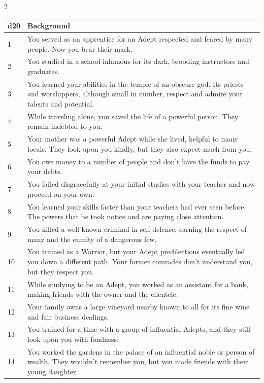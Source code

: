 \begin{multicols}{2}
\begin{table}
\begin{tabularx}{\textwidth}{| p{} | p{} |}
\hline
\textbf{d20} & \textbf{Background} \\
\hline
1 & You served as an apprentice for an Adept respected and feared by many people. Now you bear their mark. \\ \hline
2 & You studied in a school infamous for its dark, brooding instructors and graduates. \\ \hline
3 & You learned your abilities in the temple of an obscure god. Its priests and worshippers, although small in number, respect and admire your talents and potential.  \\ \hline
4 & While traveling alone, you saved the life of a powerful person. They remain indebted to you.  \\ \hline
5 & Your mother was a powerful Adept while she lived, helpful to many locals. They look upon you kindly, but they also expect much from you.  \\ \hline
6 & You owe money to a number of people and don’t have the funds to pay your debts. \\ \hline
7 & You failed disgracefully at your initial studies with your teacher and now proceed on your own. \\ \hline
8 & You learned your skills faster than your teachers had ever seen before. The powers that be took notice and are paying close attention.  \\ \hline
9 & You killed a well-known criminal in self-defense, earning the respect of many and the enmity of a dangerous few.  \\ \hline
10 & You trained as a Warrior, but your Adept predilections eventually led you down a different path. Your former comrades don’t understand you, but they respect you.  \\ \hline
11 & While studying to be an Adept, you worked as an assistant for a bank, making friends with the owner and the clientele. \\ \hline
12 & Your family owns a large vineyard nearby known to all for its fine wine and fair business dealings. \\ \hline
13 & You trained for a time with a group of influential Adepts, and they still look upon you with fondness. \\ \hline
14 & You worked the gardens in the palace of an influential noble or person of wealth. They wouldn’t remember you, but you made friends with their young daughter. \\ \hline

\end{tabularx}
\end{table}
\end{multicols}
